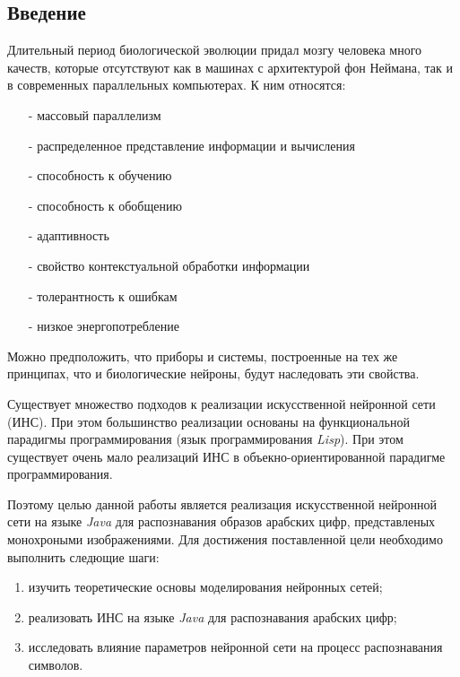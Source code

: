 \begin{center}
\section*{Введение}
\end{center}


Длительный период биологической эволюции придал мозгу человека много качеств, которые отсутствуют как в машинах с архитектурой фон Неймана, так и в современных параллельных компьютерах.
К ним относятся:
\begin{itemize}
\item[-] массовый параллелизм
\item[-] распределенное представление информации и вычисления
\item[-] способность к обучению
\item[-] способность к обобщению
\item[-] адаптивность
\item[-] свойство контекстуальной обработки информации
\item[-] толерантность к ошибкам
\item[-] низкое энергопотребление
\end{itemize}
Можно предположить, что приборы и системы, построенные на тех же принципах, что и биологические нейроны, будут наследовать эти свойства.

Существует множество подходов к реализации искусственной нейронной сети (ИНС).
При этом большинство реализации основаны на функциональной парадигмы программирования (язык программирования {\it Lisp}).
При этом существует очень мало реализаций ИНС в объекно-ориентированной парадигме программирования.

Поэтому целью данной работы является реализация искусственной нейронной сети на языке {\it Java} для распознавания образов арабских цифр, представленых монохроными изображениями.
Для достижения поставленной цели необходимо выполнить следющие шаги:
\begin{enumerate}
\item изучить теоретические основы моделирования нейронных сетей;
\item реализовать ИНС на языке {\it Java} для распознавания арабских  цифр;
\item исследовать влияние параметров нейронной сети на процесс распознавания символов.
\end{enumerate}


\newpage